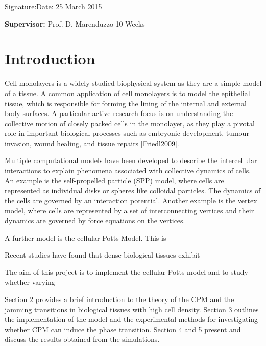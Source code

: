 \documentclass[a4paper,12pt]{article}
\begin{document}
\vspace*{2cm}
Signature:\hspace*{8cm}Date: 25 March 2015

\vfill
{\bf Supervisor:} Prof. D. Marenduzzo                 %
\hfill
10 Weeks                                         %
\newpage
%
\pagestyle{plain}                               %
\setcounter{page}{1}                            %
\tableofcontents                                %

\break
\section{Introduction}
Cell monolayers is a widely studied biophysical system as they are a simple model of a tissue. A common application of cell monolayers is to model the epithelial tissue, which is responsible for forming the lining of the internal and external body surfaces. A particular active research focus is on understanding the collective motion of closely packed cells in the monolayer, as they play a pivotal role in important biological processes such as embryonic development, tumour invasion, wound healing, and tissue repairs [Friedl2009].  

Multiple computational models have been developed to describe the intercellular interactions to explain phenomena associated with collective dynamics of cells. An example is the self-propelled particle (SPP) model, where cells are represented as individual disks or spheres like colloidal particles. The dynamics of the cells are governed by an interaction potential. Another example is the vertex model, where cells are represented by a set of interconnecting vertices and their dynamics are governed by force equations on the vertices. 

A further model is the cellular Potts Model. This is

Recent studies have found that dense biological tissues exhibit 

The aim of this project is to implement the cellular Potts model and to study whether varying

Section 2 provides a brief introduction to the theory of the CPM and the jamming transitions in biological tissues with high cell density. Section 3 outlines the implementation of the model and the experimental methods for investigating whether CPM can induce the phase transition. Section 4 and 5 present and discuss the results obtained from the simulations.
\end{document}
